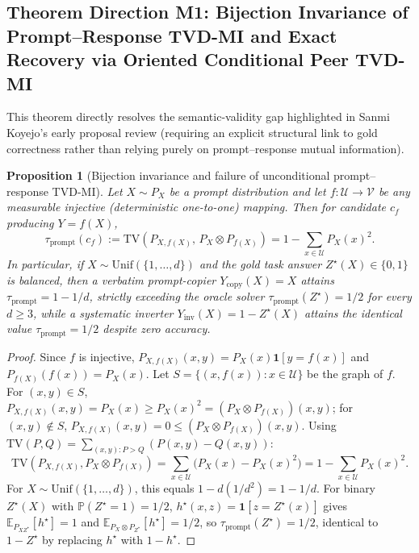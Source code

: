 \documentclass[11pt]{article}
\newtheorem{proposition}[theorem]{Proposition}
\newcommand{\E}{\mathbb{E}}
\newcommand{\Prob}{\mathbb{P}}
\newcommand{\TV}{\mathrm{TV}}
\newcommand{\cU}{\mathcal{U}}
\newcommand{\cV}{\mathcal{V}}
\newcommand{\ind}{\mathbf{1}}
\begin{document}
\subsection{Theorem Direction M1: Bijection Invariance of Prompt--Response TVD-MI and Exact Recovery via Oriented Conditional Peer TVD-MI}
\label{sec:bijection}

This theorem directly resolves the semantic-validity gap highlighted in Sanmi Koyejo's early proposal review (requiring an explicit structural link to gold correctness rather than relying purely on prompt--response mutual information).

\begin{proposition}[Bijection invariance and failure of unconditional prompt--response TVD-MI]
\label{prop:bijection}
Let $X \sim P_X$ be a prompt distribution and let $f : \cU \to \cV$ be any measurable injective (deterministic one-to-one) mapping. Then for candidate $c_f$ producing $Y = f(X)$,
\begin{equation}
\tau_{\mathrm{prompt}}(c_f) := \TV(P_{X, f(X)},\, P_X \otimes P_{f(X)}) = 1 - \sum_{x \in \cU} P_X(x)^2.
\end{equation}
In particular, if $X \sim \mathrm{Unif}(\{1,\dots,d\})$ and the gold task answer $Z^\star(X) \in \{0,1\}$ is balanced, then a verbatim prompt-copier $Y_{\mathrm{copy}}(X) = X$ attains $\tau_{\mathrm{prompt}} = 1 - 1/d$, strictly exceeding the oracle solver $\tau_{\mathrm{prompt}}(Z^\star) = 1/2$ for every $d \ge 3$, while a systematic inverter $Y_{\mathrm{inv}}(X) = 1 - Z^\star(X)$ attains the identical value $\tau_{\mathrm{prompt}} = 1/2$ despite zero accuracy.
\end{proposition}

\begin{proof}
Since $f$ is injective, $P_{X, f(X)}(x, y) = P_X(x)\ind[y = f(x)]$ and $P_{f(X)}(f(x)) = P_X(x)$. Let $S = \{(x, f(x)) : x \in \cU\}$ be the graph of $f$. For $(x,y) \in S$, $P_{X,f(X)}(x,y) = P_X(x) \ge P_X(x)^2 = (P_X \otimes P_{f(X)})(x,y)$; for $(x,y) \notin S$, $P_{X,f(X)}(x,y) = 0 \le (P_X \otimes P_{f(X)})(x,y)$. Using $\TV(P,Q) = \sum_{(x,y): P > Q}(P(x,y) - Q(x,y))$:
\begin{equation}
\TV(P_{X,f(X)}, P_X \otimes P_{f(X)}) = \sum_{x \in \cU} \big(P_X(x) - P_X(x)^2\big) = 1 - \sum_{x \in \cU} P_X(x)^2.
\end{equation}
For $X \sim \mathrm{Unif}(\{1,\dots,d\})$, this equals $1 - d(1/d^2) = 1 - 1/d$. For binary $Z^\star(X)$ with $\Prob(Z^\star=1)=1/2$, $h^\star(x,z) = \ind[z = Z^\star(x)]$ gives $\E_{P_{XZ^\star}}[h^\star] = 1$ and $\E_{P_X\otimes P_{Z^\star}}[h^\star] = 1/2$, so $\tau_{\mathrm{prompt}}(Z^\star) = 1/2$, identical to $1 - Z^\star$ by replacing $h^\star$ with $1 - h^\star$.
\end{proof}
\end{document}
